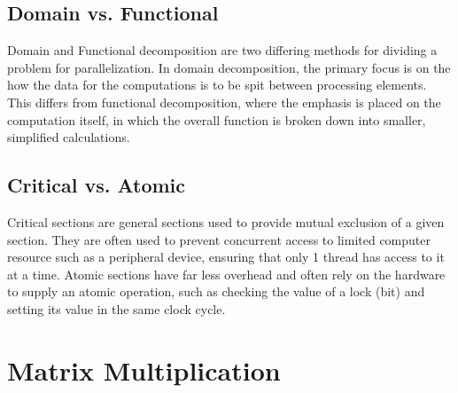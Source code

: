 \documentclass[12pt, letterpaper]{report}
\begin{document}
\subsection{Domain vs. Functional}

Domain and Functional decomposition are two differing methods for dividing a problem for parallelization. In domain decomposition, the primary focus is on the how the data for the computations is to be spit between processing elements. This differs from functional decomposition, where the emphasis is placed on the computation itself, in which the overall function is broken down into smaller, simplified calculations.

\subsection{Critical vs. Atomic}

Critical sections are general sections used to provide mutual exclusion of a given section. They are often used to prevent concurrent access to limited computer resource such as a peripheral device, ensuring that only 1 thread has access to it at a time. Atomic sections have far less overhead and often rely on the hardware to supply an atomic operation, such as checking the value of a lock (bit) and setting its value in the same clock cycle.


\section{Matrix Multiplication}
\end{document}
